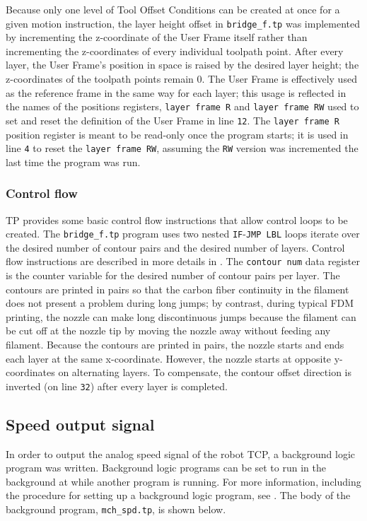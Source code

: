 Because only one level of Tool Offset Conditions can be created at once for a given motion instruction, the layer height offset in \verb|bridge_f.tp| was implemented by incrementing the z-coordinate of the User Frame itself rather than incrementing the z-coordinates of every individual toolpath point. After every layer, the User Frame's position in space is raised by the desired layer height; the z-coordinates of the toolpath points remain 0. The User Frame is effectively used as the reference frame in the same way for each layer; this usage is reflected in the names of the positions registers, \verb|layer frame R| and \verb|layer frame RW| used to set and reset the definition of the User Frame in line \verb|12|. The \verb|layer frame R| position register is meant to be read-only once the program starts; it is used in line \verb|4| to reset the \verb|layer frame RW|, assuming the \verb|RW| version was incremented the last time the program was run. 

\subsubsection{Control flow}
TP provides some basic control flow instructions that allow control loops to be created. The \verb|bridge_f.tp| program uses two nested \verb|IF|-\verb|JMP LBL| loops iterate over the desired number of contour pairs and the desired number of layers. Control flow instructions are described in more details in \cite[sec~4.7]{lr-handling-tool}. The \verb|contour num| data register is the counter variable for the desired number of contour pairs per layer. The contours are printed in pairs so that the carbon fiber continuity in the filament does not present a problem during long jumps; by contrast, during typical FDM printing, the nozzle can make long discontinuous jumps because the filament can be cut off at the nozzle tip by moving the nozzle away without feeding any filament. Because the contours are printed in pairs, the nozzle starts and ends each layer at the same x-coordinate. However, the nozzle starts at opposite y-coordinates on alternating layers. To compensate, the contour offset direction is inverted (on line \verb|32|) after every layer is completed. 

\subsection{Speed output signal}
In order to output the analog speed signal of the robot TCP, a background logic program was written. Background logic programs can be set to run in the background at while another program is running. For more information, including the procedure for setting up a background logic program, see \cite[p~618]{lr-handling-tool}. The body of the background program, \verb|mch_spd.tp|, is shown below.

